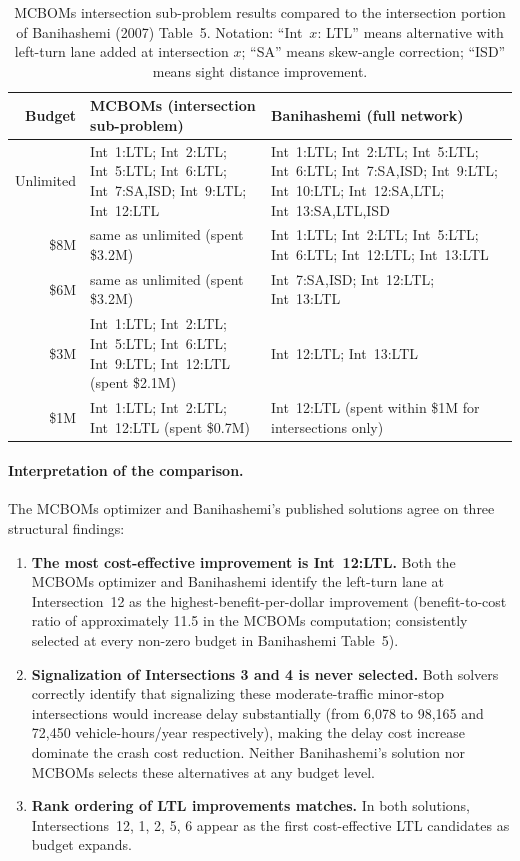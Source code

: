 \begin{table}[H]
\centering
\caption{MCBOMs intersection sub-problem results compared to the
intersection portion of Banihashemi (2007) Table~5. Notation: ``Int~$x$:
LTL'' means alternative with left-turn lane added at intersection $x$;
``SA'' means skew-angle correction; ``ISD'' means sight distance
improvement.}
\label{tab:banihashemi-results}
\scriptsize
\begin{tabular}{rp{5.4cm}p{5.4cm}}
\toprule
\textbf{Budget} & \textbf{MCBOMs (intersection sub-problem)} & \textbf{Banihashemi (full network)} \\
\midrule
Unlimited & Int~1:LTL; Int~2:LTL; Int~5:LTL; Int~6:LTL; Int~7:SA,ISD; Int~9:LTL; Int~12:LTL & Int~1:LTL; Int~2:LTL; Int~5:LTL; Int~6:LTL; Int~7:SA,ISD; Int~9:LTL; Int~10:LTL; Int~12:SA,LTL; Int~13:SA,LTL,ISD \\
\addlinespace
\$8M & same as unlimited (spent \$3.2M) & Int~1:LTL; Int~2:LTL; Int~5:LTL; Int~6:LTL; Int~12:LTL; Int~13:LTL \\
\addlinespace
\$6M & same as unlimited (spent \$3.2M) & Int~7:SA,ISD; Int~12:LTL; Int~13:LTL \\
\addlinespace
\$3M & Int~1:LTL; Int~2:LTL; Int~5:LTL; Int~6:LTL; Int~9:LTL; Int~12:LTL (spent \$2.1M) & Int~12:LTL; Int~13:LTL \\
\addlinespace
\$1M & Int~1:LTL; Int~2:LTL; Int~12:LTL (spent \$0.7M) & Int~12:LTL (spent within \$1M for intersections only) \\
\bottomrule
\end{tabular}
\end{table}

\paragraph{Interpretation of the comparison.} The MCBOMs optimizer and
Banihashemi's published solutions agree on three structural findings:

\begin{enumerate}[leftmargin=2em, itemsep=4pt]
  \item \textbf{The most cost-effective improvement is Int~12:LTL.} Both the
    MCBOMs optimizer and Banihashemi identify the left-turn lane at
    Intersection~12 as the highest-benefit-per-dollar improvement
    (benefit-to-cost ratio of approximately 11.5 in the MCBOMs computation;
    consistently selected at every non-zero budget in Banihashemi Table~5).
  \item \textbf{Signalization of Intersections 3 and 4 is never selected.}
    Both solvers correctly identify that signalizing these
    moderate-traffic minor-stop intersections would increase delay
    substantially (from 6{,}078 to 98{,}165 and 72{,}450 vehicle-hours/year
    respectively), making the delay cost increase dominate the crash cost
    reduction. Neither Banihashemi's solution nor MCBOMs selects these
    alternatives at any budget level.
  \item \textbf{Rank ordering of LTL improvements matches.} In both
    solutions, Intersections~12, 1, 2, 5, 6 appear as the first
    cost-effective LTL candidates as budget expands.
\end{enumerate}

